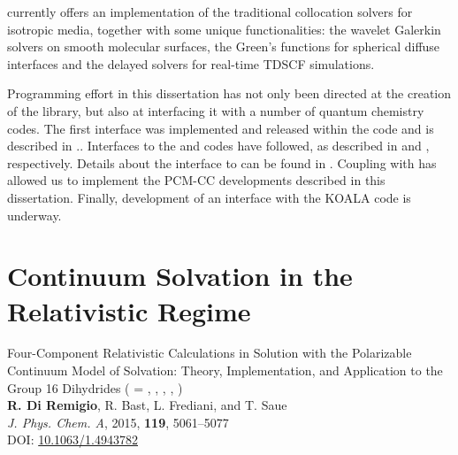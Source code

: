 \pcmsolver currently offers an implementation of the traditional collocation
solvers for isotropic media,\autocite{Tomasi2005-vm}
together with some unique functionalities: the wavelet Galerkin solvers on smooth
molecular surfaces,\autocite{Weijo2010-hy, Bugeanu2015-tp} the Green’s
functions for spherical diffuse interfaces\autocite{DiRemigio2016-nn} and
the delayed solvers for real-time \acrlong{TDSCF}
simulations.\autocite{Corni2015-pe}

Programming effort in this dissertation has not only been directed at the
creation of the \pcmsolver library, but also at interfacing it with a
number of quantum chemistry codes.
The first interface was implemented and released within the \DIRAC code
and is described in .\autocite{DIRAC15, DiRemigio2015-ou}.
Interfaces to the \LSDALTON\autocite{LSDALTON16, Aidas2013-rp} and
\DALTON\autocite{LSDALTON16, Aidas2013-rp} codes have followed, as
described in  and , respectively.\autocite{Bugeanu2015-tp, pcm-openrsp}
Details about the interface to \ReSpect\autocite{ReSpect-3.5.0} can be
found in .\autocite{pcm-respect}
Coupling with \psicode\autocite{Turney2012-de} has allowed us to implement the
\acrshort{PCM}-\acrshort{CC} developments described in this dissertation.
Finally, development of an interface with the KOALA code is underway.\autocite{Hofener2014-ex, Hofener2016-qz}

\section{Continuum Solvation in the Relativistic Regime}\label{sec:relapcm}

\begin{tcolorbox}
  {\small
  \textsf{Four-Component Relativistic Calculations in Solution with the
  Polarizable Continuum Model of Solvation: Theory,
  Implementation, and Application to the Group 16 Dihydrides
   ( = , , , ,
  )
  }
  \\
  \textbf{R. Di Remigio}, R. Bast, L. Frediani, and T. Saue
  \\
  \textit{J. Phys. Chem. A}, \textrm{2015}, \textbf{119}, 5061--5077
  \\
  DOI: \url{10.1063/1.4943782}
  }
\end{tcolorbox}

